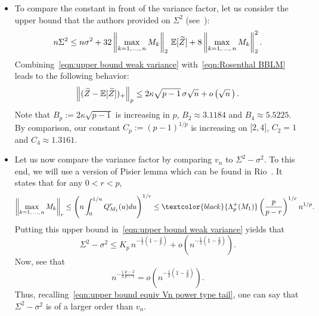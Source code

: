 \documentclass[AHL,Unicode,longabstracts,published]{cedram}
\newcommand{\bE}{\mathbb{E}}
\newcommand{\intervalleff}[2]{\mathopen{[} #1\mathclose{}\mathpunct{},#2\mathclose{]}}
\let\oldtilde\tilde
\renewcommand*{\tilde}[1]{\mathchoice{\widetilde{#1}}{\widetilde{#1}}{\oldtilde{#1}}{\oldtilde{#1}}}
\begin{document}
\begin{itemize}
\item To compare the constant in front of the variance factor, let us consider the upper bound that the authors provided on $\Sigma^2$ (see~\cite[Theorem~11.17]{BLM13}):
\begin{equation}\label{eqn:upper bound weak variance}
n\Sigma^2\leq n\sigma^2+32\left\|\max_{k=1,\,\ldots,\,n}M_k\right\|_2\,\bE[\tilde Z]+8\left\|\max_{k=1,\,\ldots,\,n}M_k\right\|_2^2.
\end{equation}
\goodbreak
Combining~\eqref{eqn:upper bound weak variance} with~\eqref{eqn:Rosenthal BBLM} leads to the following behavior:
\begin{equation}\label{eqn:Rosenthal BBLM moderate deviation}
\left\|(\tilde Z-\bE[\tilde Z])_+\right\|_p\leq 2\kappa\sqrt{p-1}\,\sigma\sqrt n+o\left(\sqrt n\,\right).
\end{equation}
Note that $B_p:= 2\kappa\sqrt{p-1}$ is increasing in $p$, $B_2\approx 3.1184$ and $B_4\approx 5.5225$. By comparison, our constant $C_p:=(p-1)^{1/p}$ is increasing on $\intervalleff 24$, $C_2= 1$ and $C_4\approx 1.3161$.
\item Let us now compare the variance factor by comparing $v_n$ to $\Sigma^2-\sigma^2$. To this end, we will use a version of Pisier lemma which can be found in Rio~\cite[Appendix D]{Rio17b}. It states that for any $0<r< p$,
\begin{equation}\label{eqn:Pisier lemma}
\left\|\max_{k=1,\,\ldots,\,n}M_k\right\|_r\leq \left(n\int_0^{1/n}Q_{M_1}^r(u)du\right)^{1/r}\leq \textcolor{black}{\Lambda_p^+(M_1)} \left(\frac{p}{p-r}\right)^{1/r}n^{1/p}.
\end{equation}
Putting this upper bound in~\eqref{eqn:upper bound weak variance} yields that
\[
\Sigma^2-\sigma^2\leq K_p\, n^{-\frac 12\left(1-\frac{2}{p}\right)}+o\left(n^{-\frac{1}{2}\left(1-\frac{2}{p}\right)}\right).
\]
Now, see that
\[
n^{-\frac{1}{2}\frac{p-2}{p-1}}=o\left(n^{-\frac{1}{2}\left(1-\frac{2}{p}\right)}\right).
\]
Thus, recalling~\eqref{eqn:upper bound equiv Vn power type tail}, one can say that $\Sigma^2-\sigma^2$ is of a larger order than $v_n$.
\end{itemize}
\end{document}
